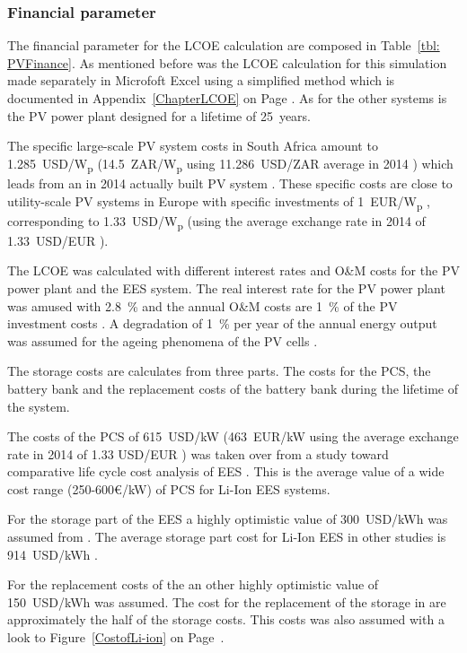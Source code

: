 \subsubsection{Financial parameter}
The financial parameter for the LCOE calculation are composed in Table~\ref{tbl: PVFinance}. As mentioned before was the LCOE calculation for this simulation made separately in Microfoft Excel using a simplified method which is documented in Appendix~\ref{ChapterLCOE} on Page \pageref{ChapterLCOE}. As for the other systems is the PV power plant designed for a lifetime of \SI{25}{years}. 

The specific large-scale PV system costs in South Africa  amount to \SI{1.285}{USD/W}\textsubscript{p} (\SI{14.5}{ZAR/W}\textsubscript{p} using \SI{11.286}{USD/ZAR} average in 2014 \cite{IRS2015}) which leads from an in 2014 actually built PV system \cite{Terblanche2015}. These specific costs are close to utility-scale PV systems in Europe with specific investments of \SI{1}{EUR/W}\textsubscript{p} \cite{FraunhoferISE2013}, corresponding to \SI{1.33}{USD/W}\textsubscript{p} (using the average exchange rate in 2014 of \SI{1.33}{USD/EUR}  \cite{StatistaGmbH2015}).

The LCOE was calculated with different interest rates and O\&M costs for the PV power plant and the EES system. The real interest rate for the PV power plant was amused with 2.8~\% \cite{FraunhoferISE2013} and the annual O\&M costs are 1~\%  of the PV investment costs \cite{IEA2014a}. A degradation of 1~\% per year of the annual energy output was assumed for the ageing phenomena of the PV cells \cite{Tidball2010}.

The storage costs are calculates from three  parts. The costs for the PCS, the battery bank and the replacement costs of the battery bank during the lifetime of the system.

The costs of the PCS of \SI{615}{USD/kW} (\SI{463}{EUR/kW} using the average exchange rate in 2014 of 1.33 USD/EUR \cite{StatistaGmbH2015}) was taken over from a study toward comparative life cycle cost analysis of EES \cite{Zakeri2015}. This is the average value of  a wide cost range (250-600€/kW) of PCS for Li-Ion EES systems.

For the storage part of the EES a highly optimistic value of \SI{300}{USD/kWh} was assumed from \cite{Nykvist2015}. The average storage part cost for Li-Ion EES in other studies is \SI{914}{USD/kWh} \cite{Zakeri2015}.

For the replacement costs of the an other highly optimistic value of \SI{150}{USD/kWh} was assumed. The cost for the replacement of the storage in \cite{Zakeri2015} are approximately the half of the storage costs. This costs was also assumed with a look to Figure~\ref{CostofLi-ion} on Page~\pageref{CostofLi-ion}.

